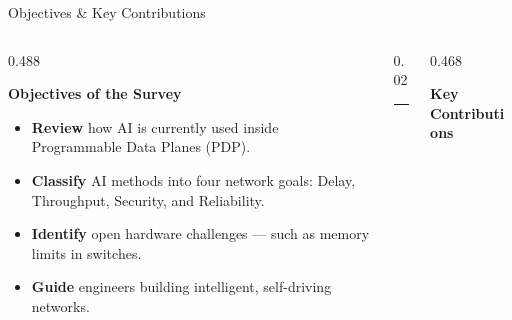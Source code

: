 {
\begin{frame}{Objectives \& Key Contributions}


  \begin{columns}[T, totalwidth=\textwidth]

    \begin{column}{0.488\textwidth}

      {\color{HUAblue}\bfseries\small Objectives of the Survey}
      \vspace{6pt}

      \begin{itemize}
        \setlength\itemsep{8pt}
        \footnotesize

        \item[\textcolor{HUAblue}{\bfseries 01}]
          \textbf{Review} how AI is currently used
          inside Programmable Data Planes (PDP).

        \item[\textcolor{HUAblue}{\bfseries 02}]
          \textbf{Classify} AI methods into four
          network goals: Delay, Throughput,
          Security, and Reliability.

        \item[\textcolor{HUAblue}{\bfseries 03}]
          \textbf{Identify} open hardware challenges
          --- such as memory limits in switches.

        \item[\textcolor{HUAblue}{\bfseries 04}]
          \textbf{Guide} engineers building
          intelligent, self-driving networks.

      \end{itemize}
    \end{column}

    \begin{column}{0.02\textwidth}
      \textcolor{HUAlight}{\rule{0.5pt}{0.45\textheight}}
    \end{column}

    \begin{column}{0.468\textwidth}

      {\color{solutiongreen}\bfseries\small Key Contributions}
      \vspace{6pt}


\end{column}
\end{columns}
\end{frame}}
